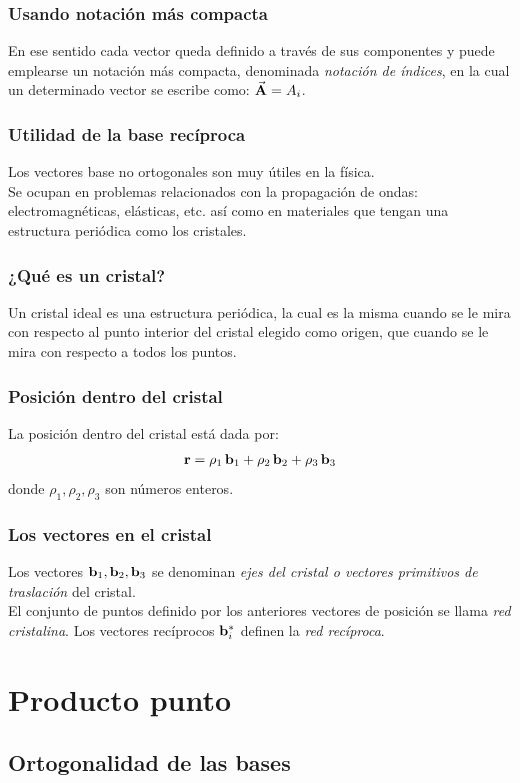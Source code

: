 \documentclass[12pt]{beamer}
\begin{document}
\begin{frame}
\frametitle{Usando notación más compacta}
En ese sentido cada vector queda definido a través de sus componentes y puede emplearse un notación más compacta, denominada \emph{notación de índices}, en la cual un determinado vector se escribe como: $\va{A} = A_{i}$.
\end{frame}
\begin{frame}
\frametitle{Utilidad de la base recíproca}
Los vectores base no ortogonales son muy útiles en la física.
\\
\bigskip
\pause
Se ocupan en problemas relacionados con la propagación de ondas: electromagnéticas, elásticas, etc. así como en materiales que tengan una estructura periódica como los cristales.
\end{frame}
\begin{frame}
\frametitle{¿Qué es un cristal?}
Un cristal ideal es una estructura periódica, la cual es la misma cuando se le mira con respecto al punto interior del cristal elegido como origen, que cuando se le mira con respecto a todos los puntos.
\end{frame}
\begin{frame}
\frametitle{Posición dentro del cristal}
La posición dentro del cristal está dada por:
\pause
\begin{align*}
\vb{r} = \rho_{1} \, \vb{b}_{1} + \rho_{2} \, \vb{b}_{2} + \rho_{3} \, \vb{b}_{3}
\end{align*}
donde $\rho_{1}, \rho_{2}, \rho_{3}$ son números enteros.
\end{frame}
\begin{frame}
\frametitle{Los vectores en el cristal}
Los vectores $\vb{b}_{1}, \vb{b}_{2}, \vb{b}_{3}$ se denominan \emph{ejes del cristal o vectores primitivos de traslación} del cristal.
\\
\bigskip
\pause
El conjunto de puntos definido por los anteriores vectores de posición se llama \emph{red cristalina}. \pause Los vectores recíprocos $\vb{b}_{i}^{*}$ definen la \emph{red recíproca}.
\end{frame}


\section{Producto punto}
\subsection{Ortogonalidad de las bases}
\end{document}
